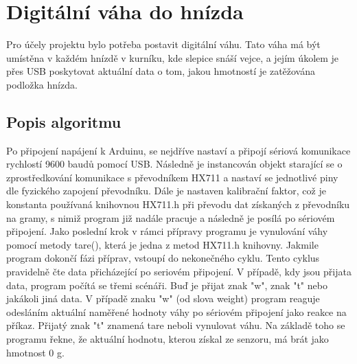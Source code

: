 \section{Digitální váha do hnízda}\label{sec:digitalni-vaha-do-hnizda}
Pro účely projektu bylo potřeba postavit digitální váhu.
Tato váha má být umístěna v každém hnízdě v kurníku, kde slepice snáší vejce, a jejím úkolem je přes USB poskytovat aktuální data o tom, jakou hmotností je zatěžována podložka hnízda.

\subsection*{Popis algoritmu}
Po připojení napájení k Arduinu, se nejdříve nastaví a připojí sériová komunikace rychlostí 9600 baudů pomocí USB.
Následně je instancován objekt starající se o zprostředkování komunikace s převodníkem HX711 a nastaví se jednotlivé piny dle fyzického zapojení převodníku.
Dále je nastaven kalibrační faktor, což je konstanta používaná knihovnou HX711.h při převodu dat získaných z převodníku na gramy, s nimiž program již nadále pracuje a následně je posílá po sériovém připojení.
Jako poslední krok v rámci přípravy programu je vynulování váhy pomocí metody tare(), která je jedna z metod HX711.h knihovny.
Jakmile program dokončí fázi příprav, vstoupí do nekonečného cyklu.
Tento cyklus pravidelně čte data přicházející po seriovém připojení.
V případě, kdy jsou přijata data, program počítá se třemi scénáři.
Buď je přijat znak "w", znak "t" nebo jakákoli jiná data.
V případě znaku "w" (od slova weight) program reaguje odesláním aktuální naměřené hodnoty váhy po sériovém připojení jako reakce na příkaz.
Přijatý znak "t" znamená tare neboli vynulovat váhu.
Na základě toho se programu řekne, že aktuální hodnotu, kterou získal ze senzoru, má brát jako hmotnost 0 g.


